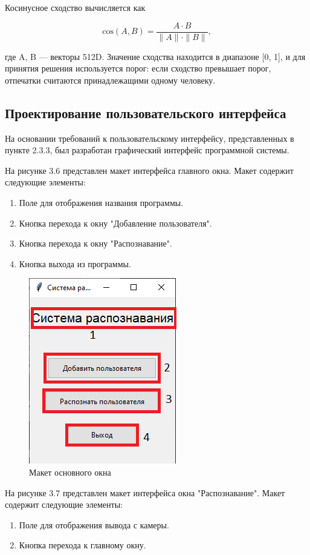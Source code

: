 Косинусное сходство вычисляется как 

\[
\text{cos}(A,B) = \frac{A \cdot B}{\|A\| \cdot \|B\|} ,
\]

где A, B — векторы 512D. Значение сходства находится в диапазоне [0, 1], и для принятия решения используется порог: если сходство превышает порог, отпечатки считаются принадлежащими одному человеку.

\subsection{Проектирование пользовательского интерфейса}

На основании требований к пользовательскому интерфейсу, представленных в пункте 2.3.3, был разработан графический интерфейс программной системы. 

На рисунке 3.6 представлен макет интерфейса главного окна. Макет содержит следующие элементы:

\begin{enumerate}
	\item Поле для отображения названия программы. 
	\item Кнопка перехода к окну "Добавление пользователя".
	\item Кнопка перехода к окну "Распознавание".
	\item Кнопка выхода из программы.
\end{enumerate}

\begin{figure}[H]
	\centering
	\includegraphics[width=0.4\linewidth]{images/maket2}
	\caption{Макет основного окна}
	\label{fig:maket2}
\end{figure}

На рисунке 3.7 представлен макет интерфейса окна "Распознавание". Макет содержит следующие элементы:

\begin{enumerate}
	\item Поле для отображения вывода с камеры.
	\item Кнопка перехода к главному окну.
\end{enumerate}


